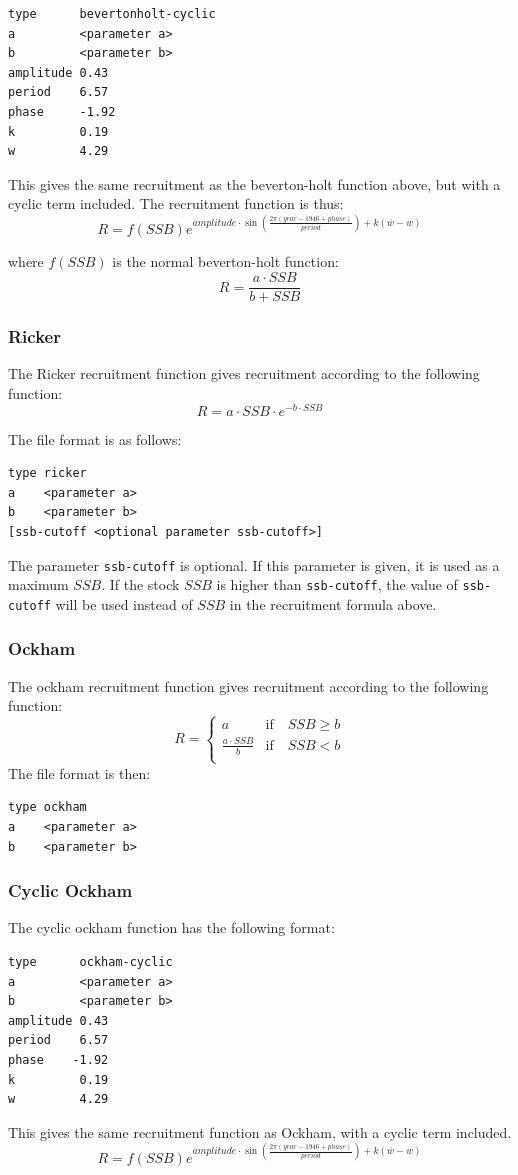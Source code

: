 \documentclass[12pt,twoside,a4paper]{article}
\begin{document}
\begin{verbatim}
type      bevertonholt-cyclic
a         <parameter a>
b         <parameter b>
amplitude 0.43
period    6.57
phase     -1.92
k         0.19
w         4.29
\end{verbatim}

This gives the same recruitment as the beverton-holt function above,
but with a cyclic term included. The recruitment function is thus:
\[
R=f(SSB)e^{amplitude\cdot \sin(\frac{2\pi(year-1946+phase)}{period})
+k(\bar{w}-w)}
\]

where $f(SSB)$ is the normal beverton-holt function:
\[R=\frac{a\cdot SSB}{b+SSB}\]


\subsubsection*{Ricker}
The Ricker recruitment function gives recruitment according to the
following function:
\[R=a\cdot SSB \cdot e^{-b\cdot SSB}\]

The file format is as follows:
\begin{verbatim}
type ricker
a    <parameter a>
b    <parameter b>
[ssb-cutoff <optional parameter ssb-cutoff>]
\end{verbatim}

The parameter \verb+ssb-cutoff+ is optional. If this parameter is given, it 
is used as a maximum $SSB$. If the stock $SSB$ is higher than 
\verb+ssb-cutoff+,
the value of \verb+ssb-cutoff+ will be used instead of $SSB$ in the recruitment
formula above.

\subsubsection*{Ockham}
The ockham recruitment function gives recruitment according to the
following function:
\[
R=\left\{\begin{array}{ll}
    a & \textrm{if} \quad SSB \ge b \\
    \frac{a \cdot SSB}{b} & \textrm{if} \quad SSB < b \\
  \end{array}
  \right.
\]
The file format is then:
\begin{verbatim}
type ockham
a    <parameter a>
b    <parameter b>
\end{verbatim}

\subsubsection*{Cyclic Ockham}
The cyclic ockham function has the following format:
\begin{verbatim}
type      ockham-cyclic
a         <parameter a>
b         <parameter b>
amplitude 0.43
period    6.57
phase    -1.92
k         0.19
w         4.29 
\end{verbatim}
This gives the same recruitment function as Ockham, with a cyclic term
included.
\[
R=f(SSB)e^{amplitude\cdot \sin(\frac{2\pi(year-1946+phase)}{period})
+k(\bar{w}-w)}
\]
\end{document}
